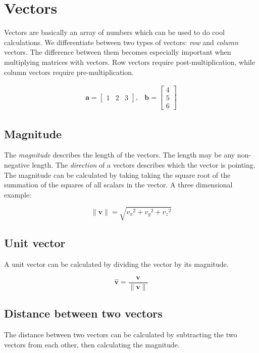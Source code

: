 \section{Vectors}

Vectors are basically an array of numbers which can be used to do cool calculations. We differentiate between two types of vectors: \textit{row} and \textit{column} vectors. The difference between them becomes especially important when multiplying matrices with vectors. Row vectors require post-multiplication, while column vectors require pre-multiplication.

$$
\begin{array}{cc}
\textbf{a} = \begin{bmatrix}
1 & 2 & 3
\end{bmatrix},
&
\textbf{b} = \begin{bmatrix}
4 \\ 5 \\ 6
\end{bmatrix}
\end{array}
$$

\subsection{Magnitude}

The \textit{magnitude} describes the length of the vectors. The length may be any non-negative length. The \textit{direction} of a vectors describes which the vector is pointing. The magnitude can be calculated by taking taking the square root of the summation of the squares of all scalars in the vector. A three dimensional example:

$$\|\textbf{v}\|=\sqrt{{v_x}^2+{v_y}^2+{v_z}^2}$$

\subsection{Unit vector}

A unit vector can be calculated by dividing the vector by its magnitude.

$$\hat{\textbf{v}}=\frac{\textbf{v}}{\|\textbf{v}\|}$$

\subsection{Distance between two vectors}

The distance between two vectors can be calculated by subtracting the two vectors from each other, then calculating the magnitude.

